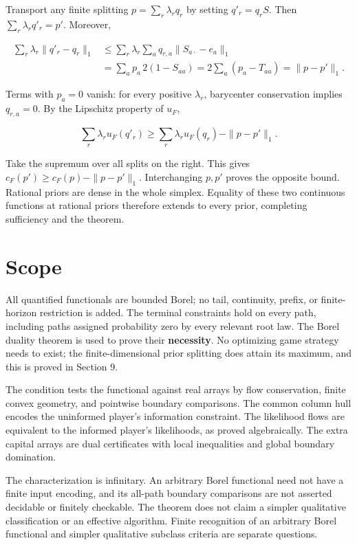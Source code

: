 \documentclass[11pt,a4paper]{article}
\begin{document}
Transport any finite splitting \(p=\sum_r\lambda_rq_r\) by setting \(q'_r=q_r S\). Then \(\sum_r\lambda_rq'_r=p'\). Moreover,

\[
\begin{aligned}
\sum_r\lambda_r\|q'_r-q_r\|_1
&\le\sum_r\lambda_r\sum_aq_{r,a}\|S_{a\cdot}-e_a\|_1\\
&=\sum_ap_a\,2(1-S_{aa})
=2\sum_a(p_a-T_{aa})=\|p-p'\|_1.
\end{aligned}
\]

Terms with \(p_a=0\) vanish: for every positive \(\lambda_r\), barycenter conservation implies \(q_{r,a}=0\). By the Lipschitz property of \(u_F\),

\[
\sum_r\lambda_ru_F(q'_r)
\ge\sum_r\lambda_ru_F(q_r)-\|p-p'\|_1.
\]

Take the supremum over all splits on the right. This gives \(c_F(p')\ge c_F(p)-\|p-p'\|_1\). Interchanging \(p,p'\) proves the opposite bound. Rational priors are dense in the whole simplex. Equality of these two continuous functions at rational priors therefore extends to every prior, completing sufficiency and the theorem.

\section{Scope}

All quantified functionals are bounded Borel; no tail, continuity, prefix, or finite-horizon restriction is added. The terminal constraints hold on every path, including paths assigned probability zero by every relevant root law. The Borel duality theorem is used to prove their \textbf{necessity}. No optimizing game strategy needs to exist; the finite-dimensional prior splitting does attain its maximum, and this is proved in Section 9.

The condition tests the functional against real arrays by flow conservation, finite convex geometry, and pointwise boundary comparisons. The common column hull encodes the uninformed player's information constraint. The likelihood flows are equivalent to the informed player's likelihoods, as proved algebraically. The extra capital arrays are dual certificates with local inequalities and global boundary domination.

The characterization is infinitary. An arbitrary Borel functional need not have a finite input encoding, and its all-path boundary comparisons are not asserted decidable or finitely checkable. The theorem does not claim a simpler qualitative classification or an effective algorithm. Finite recognition of an arbitrary Borel functional and simpler qualitative subclass criteria are separate questions.
\end{document}
